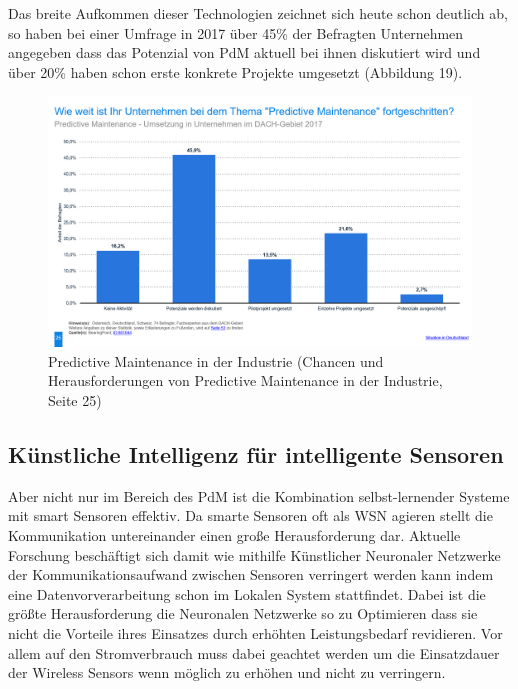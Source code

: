 \documentclass[a4paper,12pt]{scrartcl}
\begin{document}
\cite{(The Industrial Internet of Things and low-cost sensors make PdM a must-have tool to stay competitiv, Seite 28)} 

Das breite Aufkommen dieser Technologien zeichnet sich heute schon deutlich ab, so haben bei einer Umfrage in 2017 über 45\% der Befragten Unternehmen angegeben dass das Potenzial von PdM aktuell bei ihnen diskutiert wird und über 20\% haben schon erste konkrete Projekte umgesetzt (Abbildung 19). \\

\begin{figure}[H]
\centering
\includegraphics[scale=0.45]{picture/PM}
\caption{Predictive Maintenance in der Industrie (Chancen und Herausforderungen von Predictive Maintenance in der Industrie, Seite 25)}
\label{fig:Smart Factory - Genutzte Technologien in Deutschland 2017}
\end{figure}

\subsection{Künstliche Intelligenz für intelligente Sensoren}
Aber nicht nur im Bereich des PdM ist die Kombination selbst-lernender Systeme mit smart Sensoren effektiv. Da smarte Sensoren oft als WSN agieren stellt die Kommunikation untereinander einen große Herausforderung dar. Aktuelle Forschung beschäftigt sich damit wie mithilfe Künstlicher Neuronaler Netzwerke der Kommunikationsaufwand zwischen Sensoren verringert werden kann indem eine Datenvorverarbeitung schon im Lokalen System stattfindet. Dabei ist die größte Herausforderung die Neuronalen Netzwerke so zu Optimieren dass sie nicht die Vorteile ihres Einsatzes durch erhöhten Leistungsbedarf revidieren. Vor allem auf den Stromverbrauch muss dabei geachtet werden um die Einsatzdauer der Wireless Sensors wenn möglich zu erhöhen und nicht zu verringern.
\cite{(Article Components of Artificial Neural Networks Realized in CMOS Technology to be Used in Intelligent Sensors in Wireless Sensor Networks, Seite 3 ff.)}   
\end{document}
